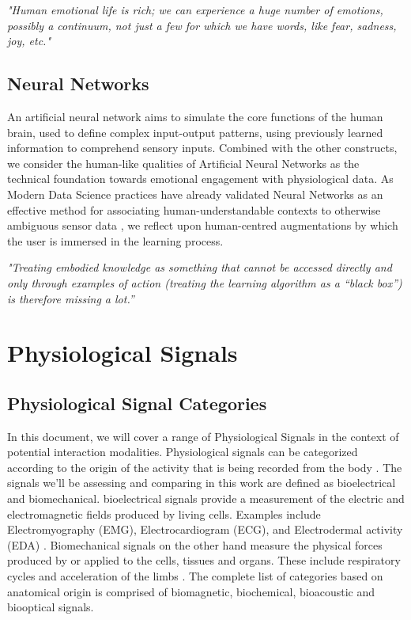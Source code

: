 \textit{"Human emotional life is rich; we can experience a huge number of emotions, possibly a continuum, not just a few for which we have words, like fear, sadness, joy, etc."}  \cite{perlovsky_aesthetic_2014}


\subsection{Neural Networks}

An artificial neural network aims to simulate the core functions of the human brain, used to define complex input-output patterns, using previously learned information to comprehend sensory inputs. Combined with the other constructs, we consider the human-like qualities of Artificial Neural Networks as the technical foundation towards emotional engagement with physiological data. As Modern Data Science practices have already validated Neural Networks as an effective method for associating human-understandable contexts to otherwise ambiguous sensor data \cite{bota_review_2019}, we reflect upon human-centred augmentations by which the user is immersed in the learning process.

\textit{"Treating embodied knowledge as something that cannot be accessed directly and only through examples of action (treating the learning algorithm as a “black box”) is therefore missing a lot.” }

 \cite{gillies_understanding_2019}


\section{Physiological Signals}

\subsection{Physiological Signal Categories}
\label{subsec:catagories}

In this document, we will cover a range of Physiological Signals in the context of potential interaction modalities. Physiological signals can be categorized according to the origin of the activity that is being recorded from the body \cite{enderle_introduction_2012}. The signals we'll be assessing and comparing in this work are defined as bioelectrical and biomechanical. bioelectrical signals provide a measurement of the electric and electromagnetic fields produced by living cells. Examples include Electromyography (EMG), Electrocardiogram (ECG), and Electrodermal activity (EDA) \cite{malmivuo_bioelectromagnetismprinciples_1995}. Biomechanical signals on the other hand measure the physical forces produced by or applied to the cells, tissues and organs. These include respiratory cycles and acceleration of the limbs \cite{guerreiro_bitalino_2013, pacelli_sensing_2006}. The complete list of categories based on anatomical origin is comprised of biomagnetic, biochemical, bioacoustic and biooptical signals.


